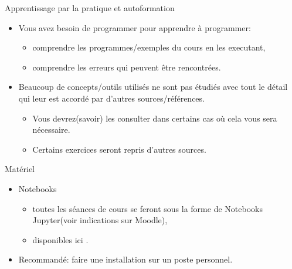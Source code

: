 \documentclass[notes, ignorenonframetext, compress, 10pt, xcolor=svgnames, aspectratio=169]{beamer}
\begin{document}
\begin{frame}[allowframebreaks]{Apprentissage par la pratique et autoformation}
    \begin{itemize}
        \item Vous avez besoin de programmer pour apprendre à programmer:
        \begin{itemize}
            \item comprendre les programmes/exemples du cours en les executant,
            \item comprendre les erreurs qui peuvent être rencontrées.
        \end{itemize}
        \item Beaucoup de concepts/outils utilisés ne sont pas étudiés avec tout le détail qui leur est accordé 
        par d'autres sources/références.
        \begin{itemize}
            \item Vous devrez(savoir) les consulter dans certains cas où cela vous sera nécessaire.
            \item Certains exercices seront repris d'autres sources.
        \end{itemize}
    \end{itemize}
\end{frame}

\begin{frame}[allowframebreaks]{Matériel}
    \begin{itemize}
        \item Notebooks
        \begin{itemize}
            \item toutes les séances de cours se feront sous la forme de Notebooks Jupyter(voir indications sur Moodle),
            \item disponibles ici \url{}.
        \end{itemize} 
        \item  Recommandé: faire une installation sur un poste personnel.
    \end{itemize}
\end{frame}

\end{document}
